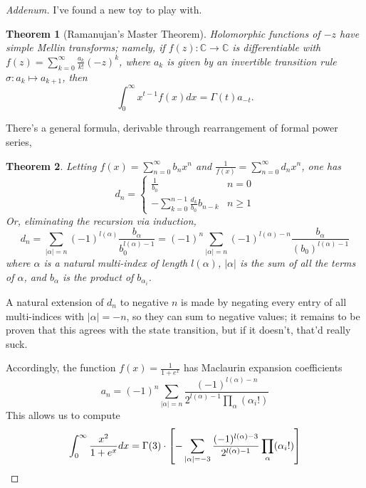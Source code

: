 \documentclass{article}
\newtheorem{thm}{Theorem}
\begin{document}
\begin{proof}[Addenum]
  I've found a new toy to play with.
  \begin{thm}[Ramanujan's Master Theorem]
    Holomorphic functions of $-z$ have simple Mellin transforms; namely, if $f(z): \mathbb{C} \to \mathbb{C}$ is differentiable with
    $f(z) = \sum_{k = 0}^{\infty} \frac{a_{k}}{k!}(-z)^{k}$, where $a_{k}$ is given by an invertible transition rule $\sigma: a_{k} \mapsto a_{k+1}$,
    then
    \[
      \int_{0}^{\infty}x^{t-1}f(x)dx = \Gamma(t)a_{-t}.
    \]
  \end{thm}
  There's a general formula, derivable through rearrangement of formal power series,
  \begin{thm}
    Letting $f(x) = \sum_{n = 0}^{\infty}b_{n}x^{n}$ and $\frac{1}{f(x)} = \sum_{n = 0}^{\infty}d_{n}x^{n}$, one has
    \[
      d_{n} =
      \begin{cases}
        \frac{1}{b_{0}} & n = 0 \\
        -\sum_{k = 0}^{n-1}\frac{d_{k}}{b_{0}}b_{n - k} & n \geq 1
      \end{cases}
    \]
    Or, eliminating the recursion via induction,
    \[
      d_{n} = \sum_{|\alpha| = n}(-1)^{l(\alpha)}\frac{b_{\alpha}}{b_{0}^{l(\alpha) - 1}} = (-1)^{n}\sum_{|\alpha| = n}(-1)^{l(\alpha) - n}
      \frac{b_{\alpha}}{(b_{0})^{l(\alpha) - 1}}
    \]
    where $\alpha$ is a natural multi-index of length $l(\alpha)$, $|\alpha|$ is the sum of all the terms of $\alpha$,
    and $b_{\alpha}$ is the product of $b_{\alpha_{i}}$.
  \end{thm}
  A natural extension of $d_{n}$ to negative $n$ is made by negating every entry of all multi-indices with $|\alpha| = -n$,
  so they can sum to negative values; it remains to be proven that this agrees with the state transition, but if it doesn't, that'd really suck.

  Accordingly, the function $f(x) = \frac{1}{1 + e^{x}}$ has Maclaurin expansion coefficients
  \[
    a_{n} = (-1)^{n}\sum_{|\alpha| = n}\frac{(-1)^{l(\alpha) - n}}{2^{l(\alpha) - 1}\prod_{\alpha}(\alpha_{i}!)}
  \]
  This allows us to compute
  \[
    \int_{0}^{\infty}\frac{x^{2}}{1 + e^{x}}dx = \Gamma(3) \cdot \qty[- \sum_{|\alpha| = - 3}\frac{(-1)^{l(\alpha) - 3}}{2^{l(\alpha) - 1}}
    \prod_{\alpha}(\alpha_{i}!)]
  \]
\end{proof}
\end{document}
